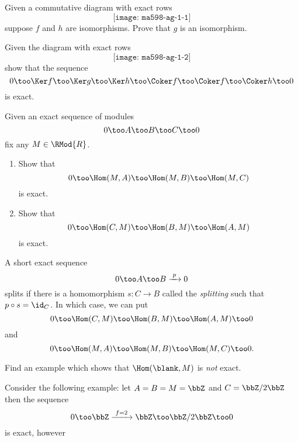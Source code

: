 \begin{problem}[\(5\)-lemma]
  Given a commutative diagram with exact rows
  \[
    \texttt{[image: ma598-ag-1-1]}
  \]
  suppose \(f\) and \(h\) are isomorphisms. Prove that \(g\) is an
  isomorphism.
\end{problem}
\begin{solution}

\end{solution}
\newpage

\begin{problem}
  Given the diagram with exact rows
  \[
    \texttt{[image: ma598-ag-1-2]}
  \]
  show that the sequence
  \[
    0\too
    \Ker f\too
    \Ker g\too
    \Ker h\too
    \Coker f\too
    \Coker f\too
    \Coker h\too
    0
  \]
  is exact.
\end{problem}
\begin{solution}
\end{solution}
\newpage

\begin{problem}
  Given an exact sequence of modules
  \[
    0\too A\too B\too C\too 0
  \]
  fix any \(M\in\RMod{R}\).
  \begin{enumerate}[label=(\alph*)]
  \item Show that
    \[
      0\too \Hom(M,A)\too\Hom(M,B)\too\Hom(M,C)
    \]
    is exact.
  \item Show that
    \[
      0\too \Hom(C,M)\too\Hom(B,M)\too\Hom(A,M)
    \]
    is exact.
  \end{enumerate}
\end{problem}
\begin{solution}
\end{solution}
\newpage

\begin{problem}
  A short exact sequence
  \[
    0\too A\too B\xrightarrow{\,\,p\,\,} 0
  \]
  splits if there is a homomorphism \(s\colon C\to B\) called the
  \emph{splitting} such that \(p\circ s=\id_C\). In which case, we can put
  \[
    0\too\Hom(C,M)\too\Hom(B,M)\too\Hom(A,M)\too 0
  \]
  and
  \[
    0\too\Hom(M,A)\too\Hom(M,B)\too\Hom(M,C)\too 0.
  \]
\end{problem}
\begin{solution}
  \textsf{}
\end{solution}
\newpage

\begin{problem}
  Find an example which shows that \(\Hom(\blank,M)\) is \emph{not} exact.
\end{problem}
\begin{solution}
  Consider the following example: let \(A=B=M=\bbZ\) and \(C=\bbZ/2\bbZ\)
  then the sequence
  \[
    0\too\bbZ\xrightarrow{\,\,f=2\,\,}\bbZ\too\bbZ/2\bbZ\too 0
  \]
  is exact, however
\end{solution}

